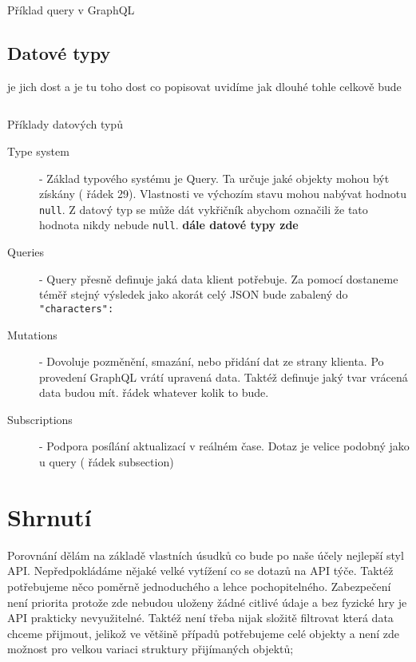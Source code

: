\begin{listing}[ht!]
    \inputminted[]{graphql}{resources/code//standards/playerquery.gql}
    \caption{Příklad query v GraphQL}
    \label{code:gql_querry}
\end{listing}

\subsection{Datové typy}
je jich dost a je tu toho dost co popisovat
uvidíme jak dlouhé tohle celkově bude


\begin{listing}[ht]
    \inputminted[]{graphql}{resources/code/standards/types.example.gql}
    \caption{Příklady datových typů}
    \label{code:gql_datatypes}
\end{listing}

\begin{description}
    \item[Type system] - Základ typového systému je Query. Ta určuje jaké objekty mohou být získány ( řádek 29). Vlastnosti ve výchozím stavu mohou nabývat hodnotu \texttt{null}. Z datový typ se může dát vykřičník abychom označili že tato hodnota nikdy nebude \texttt{null}. \textbf{dále datové typy zde}
    \item[Queries] - Query přesně definuje jaká data klient potřebuje. Za pomocí  dostaneme téměř stejný výsledek jako  akorát celý JSON bude zabalený do \texttt{"characters": {}}
    \item[Mutations] - Dovoluje pozměnění, smazání, nebo přidání dat ze strany klienta. Po provedení GraphQL vrátí upravená data. Taktéž definuje jaký tvar vrácená data budou mít.  řádek whatever kolik to bude.
    \item[Subscriptions] - Podpora posílání aktualizací v reálném čase. Dotaz je velice podobný jako u query ( řádek subsection)
\end{description}

\section{Shrnutí}

Porovnání dělám na základě vlastních úsudků co bude po naše účely nejlepší styl API. Nepředpokládáme nějaké velké vytížení co se dotazů na API týče. Taktéž potřebujeme něco poměrně jednoduchého a lehce pochopitelného. Zabezpečení není priorita protože zde nebudou uloženy žádné citlivé údaje a bez fyzické hry je API prakticky nevyužitelné. Taktéž není třeba nijak složitě filtrovat která data chceme přijmout, jelikož ve většině případů potřebujeme celé objekty a není zde možnost pro velkou variaci struktury přijímaných objektů;

